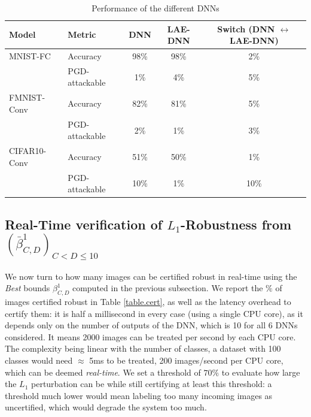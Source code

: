 \begin{table}[h!]
    \centering
    \begin{tabular}{llccc}
        \toprule
        \textbf{Model} & \textbf{Metric} & \textbf{DNN} & \textbf{LAE-DNN} & \textbf{Switch (DNN $\leftrightarrow$ LAE-DNN)} \\
        \midrule
        MNIST-FC & Accuracy & 98\% & 98\% & 2\% \\
                 & PGD-attackable & 1\% & 4\% & 5\% \\
        \midrule
        FMNIST-Conv & Accuracy & 82\% & 81\% & 5\% \\
                                     & PGD-attackable & 2\% & 1\% & 3\% \\
        \midrule
        CIFAR10-Conv & Accuracy & 51\% & 50\% & 1\% \\
                    & PGD-attackable & 10\% & 1\% & 10\% \\
        \bottomrule
    \end{tabular}
	\caption{Performance of the different DNNs}
    \label{tab:dnn_comparison}
\end{table}




\subsection{Real-Time verification of $L_1$-Robustness from 
$(\bar{\beta}^1_{C,D})_{C<D \leq 10}$}

\label{sec:realtime}


We now turn to how many images can be certified robust in real-time using the {\em Best} bounds $\beta^1_{C,D}$ computed in the previous subsection. We report the $\%$ of images certified robust in Table \ref{table.cert}, as well as the latency overhead to certify them: it is half a millisecond in every case (using a single CPU core), as it depends only on the number of outputs of the DNN, which is 10 for all 6 DNNs considered. It means 2000 images can be treated per second by each CPU core.
The complexity being linear with the number of classes, a dataset with 100 classes would need $\approx$ 5ms to be treated, 200 images/second per CPU core, which can be deemed {\em real-time}. 
We set a threshold of {\color{blue} $70\%$} to evaluate how large the $L_1$ perturbation can be while still certifying at least this threshold: a threshold much lower would mean labeling too many incoming images as uncertified, which would degrade the system too much.



